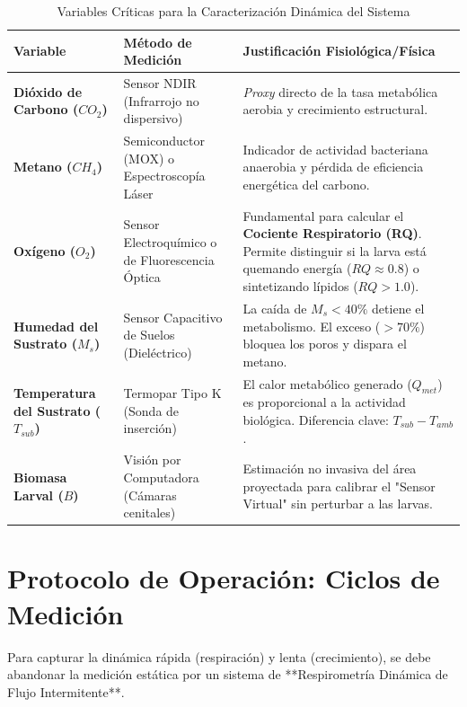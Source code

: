 \begin{table}[h!]
    \centering
    \caption{Variables Críticas para la Caracterización Dinámica del Sistema}
    \label{tab:protocolo_sensores}
    \begin{tabular}{p{3cm} p{4cm} p{7cm}}
        \hline
        \textbf{Variable} & \textbf{Método de Medición} & \textbf{Justificación Fisiológica/Física} \\ \hline
        \textbf{Dióxido de Carbono ($CO_2$)} & Sensor NDIR (Infrarrojo no dispersivo) & \textit{Proxy} directo de la tasa metabólica aerobia y crecimiento estructural. \\ \hline
        \textbf{Metano ($CH_4$)} & Semiconductor (MOX) o Espectroscopía Láser & Indicador de actividad bacteriana anaerobia y pérdida de eficiencia energética del carbono. \\ \hline
        \textbf{Oxígeno ($O_2$)} & Sensor Electroquímico o de Fluorescencia Óptica & Fundamental para calcular el \textbf{Cociente Respiratorio (RQ)}. Permite distinguir si la larva está quemando energía ($RQ \approx 0.8$) o sintetizando lípidos ($RQ > 1.0$). \\ \hline
        \textbf{Humedad del Sustrato ($M_s$)} & Sensor Capacitivo de Suelos (Dieléctrico) & La caída de $M_s < 40\%$ detiene el metabolismo. El exceso ($>70\%$) bloquea los poros y dispara el metano. \\ \hline
        \textbf{Temperatura del Sustrato ($T_{sub}$)} & Termopar Tipo K (Sonda de inserción) & El calor metabólico generado ($Q_{met}$) es proporcional a la actividad biológica. Diferencia clave: $T_{sub} - T_{amb}$. \\ \hline
        \textbf{Biomasa Larval ($B$)} & Visión por Computadora (Cámaras cenitales) & Estimación no invasiva del área proyectada para calibrar el "Sensor Virtual" sin perturbar a las larvas. \\ \hline
    \end{tabular}
\end{table}

\section{Protocolo de Operación: Ciclos de Medición}

Para capturar la dinámica rápida (respiración) y lenta (crecimiento), se debe abandonar la medición estática por un sistema de **Respirometría Dinámica de Flujo Intermitente**.

